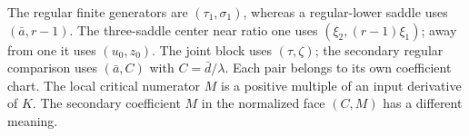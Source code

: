 The regular finite generators are $(\tau_1,\sigma_1)$, whereas a
regular-lower saddle uses $(\bar a,r-1)$. The three-saddle center
near ratio one uses $(\xi_2,(r-1)\xi_1)$; away from one it uses
$(u_0,z_0)$. The joint block uses $(\tau,\zeta)$;
the secondary regular comparison uses $(\bar a,C)$ with
$C=\bar d/\lambda$. Each pair belongs to its own coefficient chart.
The local critical numerator $M$ is a positive multiple of an input
derivative of $K$.
The secondary coefficient $M$ in the normalized face $(C,M)$ has a
different meaning.






